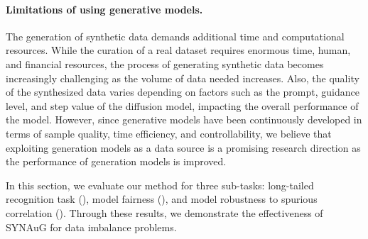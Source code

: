 
\paragraph{Limitations of using generative models.}
The generation of synthetic data demands additional time and computational resources. 
While the curation of a real dataset requires enormous time, human, and financial resources, the process of generating synthetic data becomes increasingly challenging as the volume of data needed increases.
Also, the quality of the synthesized data varies depending on factors such as the prompt, guidance level, and step value of the diffusion model, impacting the overall performance of the model. 
However, since generative models have been continuously developed in terms of sample quality, time efficiency, and controllability,
we believe that exploiting generation models as a data source is a promising research direction as the performance of generation models is improved.




In this section, 
we evaluate our method for three sub-tasks: long-tailed recognition task (), model fairness (), and model robustness to spurious correlation ().
Through these results, we demonstrate the effectiveness of SYNAuG for data imbalance problems.



